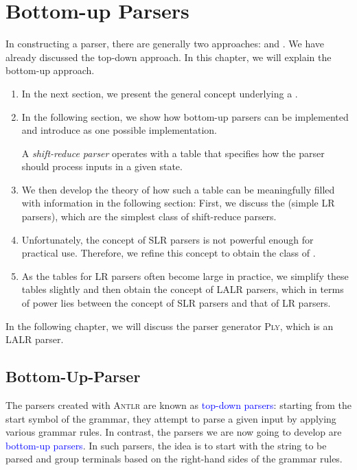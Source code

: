 \chapter{Bottom-up Parsers\label{chapter:bottom-up}}
In constructing a parser, there are generally two approaches:  and . We have already discussed the top-down approach. In this chapter, we will explain the bottom-up approach.
\begin{enumerate}
\item In the next section, we present the general concept underlying a
      .
\item In the following section, we show how bottom-up parsers can be implemented and introduce
       as one possible implementation. 

      A \emph{shift-reduce parser} operates with a table that specifies how the parser should process inputs in
      a given state. 
\item We then develop the theory of how such a table can be meaningfully filled with information in the
      following section: First, we discuss the  (simple LR parsers), which are the simplest
      class of shift-reduce parsers. 
\item Unfortunately, the concept of SLR parsers is not powerful enough for practical use. Therefore, we refine
      this concept to obtain the class of .
\item As the tables for LR parsers often become large in practice, we simplify these tables slightly and
      then obtain the concept of LALR parsers, which in terms of power lies between the concept of
      SLR parsers and that of LR parsers.
\end{enumerate}
In the following chapter, we will discuss the parser generator \textsc{Ply}, which is an LALR parser.


\section{Bottom-Up-Parser}
The parsers created with \textsc{Antlr} are known as \textcolor{blue}{top-down parsers}: starting from the start symbol of the grammar, they attempt to parse a given input by applying various grammar rules. In contrast, the parsers we are now going to develop are \textcolor{blue}{bottom-up parsers}. In such parsers, the idea is to start with the string to be parsed and group terminals based on the right-hand sides of the grammar rules. 

